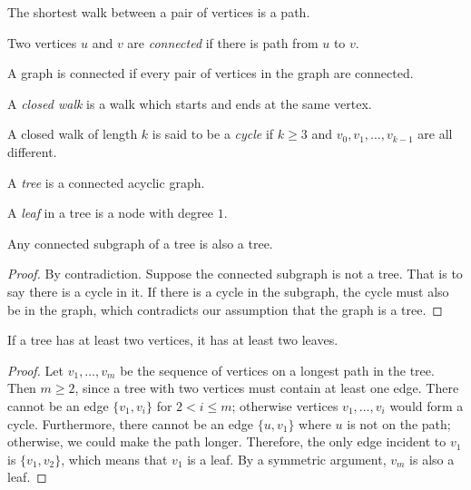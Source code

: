 \documentclass[11pt]{article}
\begin{document}
\begin{corollary}
The shortest walk between a pair of vertices is a path.
\end{corollary}

\begin{definition}
Two vertices $u$ and $v$ are \emph{connected} if there is path from $u$ to $v$.
\end{definition}

\begin{definition}
A graph is connected if every pair of vertices in the graph are connected.
\end{definition}

\begin{definition}
A \emph{closed walk} is a walk which starts and ends at the same vertex.
\end{definition}

\begin{definition}
A closed walk of length $k$ is said to be a \emph{cycle} if $k \geq 3$ and $v_0,v_1,\dots,v_{k-1}$
are all different.
\end{definition}

\begin{definition}
A \emph{tree} is a connected acyclic graph.
\end{definition}

\begin{definition}
A \emph{leaf} in a tree is a node with degree $1$.
\end{definition}

\begin{lemma}
Any connected subgraph of a tree is also a tree.
\end{lemma}

\begin{proof}
By contradiction. Suppose the connected subgraph is not a tree. That is to say there is a cycle in
it. If there is a cycle in the subgraph, the cycle must also be in the graph, which contradicts our
assumption that the graph is a tree.
\end{proof}

\begin{theorem}
If a tree has at least two vertices, it has at least two leaves.
\end{theorem}

\begin{proof}
Let $v_1,\dots,v_m$ be the sequence of vertices on a longest path in the tree. Then $m \geq 2$, since a
tree with two vertices must contain at least one edge. There cannot be an edge $\{v_1,v_i\}$ for
$2 < i \leq m$; otherwise vertices $v_1,\dots,v_i$ would form a cycle. Furthermore, there cannot be an
edge $\{u,v_1\}$ where $u$ is not on the path; otherwise, we could make the path longer. Therefore, the
only edge incident to $v_1$ is $\{v_1,v_2\}$, which means that $v_1$ is a leaf. By a symmetric argument,
$v_m$ is also a leaf.
\end{proof}
\end{document}
